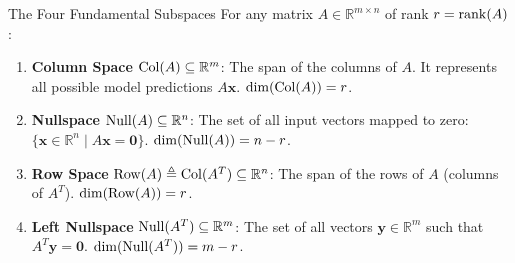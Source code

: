 \begin{definitionbox}{The Four Fundamental Subspaces}
For any matrix $A \in \mathbb{R}^{m \times n}$ of rank $r = \operatorname{rank}(A)$:
\begin{enumerate}
    \item \textbf{Column Space} $\operatorname{Col}(A) \subseteq \mathbb{R}^m$: The span of the columns of $A$. It represents all possible model predictions $A\mathbf{x}$. $\dim(\operatorname{Col}(A)) = r$.
    \item \textbf{Nullspace} $\operatorname{Null}(A) \subseteq \mathbb{R}^n$: The set of all input vectors mapped to zero: $\{\mathbf{x} \in \mathbb{R}^n \mid A\mathbf{x} = \mathbf{0}\}$. $\dim(\operatorname{Null}(A)) = n - r$.
    \item \textbf{Row Space} $\operatorname{Row}(A) \triangleq \operatorname{Col}(A^T) \subseteq \mathbb{R}^n$: The span of the rows of $A$ (columns of $A^T$). $\dim(\operatorname{Row}(A)) = r$.
    \item \textbf{Left Nullspace} $\operatorname{Null}(A^T) \subseteq \mathbb{R}^m$: The set of all vectors $\mathbf{y} \in \mathbb{R}^m$ such that $A^T \mathbf{y} = \mathbf{0}$. $\dim(\operatorname{Null}(A^T)) = m - r$.
\end{enumerate}
\end{definitionbox}

